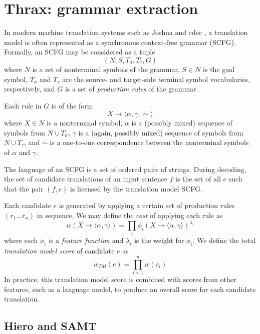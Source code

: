\documentclass[11pt]{article}
\begin{document}
\section{Thrax: grammar extraction}

In modern machine translation systems such as Joshua \cite{Joshua-WMT} and cdec \cite{cdec}, a translation model is often represented as a synchronous context-free grammar (SCFG). Formally, an SCFG may be considered as a tuple
$$(N,S,T_\sigma,T_\tau,G)$$
where $N$ is a set of nonterminal symbols of the grammar, $S \in N$ is the goal symbol, $T_\sigma$ and $T_\tau$ are the source- and target-side terminal symbol vocabularies, respectively, and $G$ is a set of {\em production rules} of the grammar.

Each rule in $G$ is of the form
$$X \to \langle \alpha , \gamma , \sim \rangle$$
where $X \in N$ is a nonterminal symbol, $\alpha$ is a (possibly mixed) sequence of symbols from $N \cup T_\sigma$, $\gamma$ is a (again, possibly mixed) sequence of symbols from $N \cup T_\tau$, and $\sim$ is a one-to-one correspondence between the nonterminal symbols of $\alpha$ and $\gamma$.

The language of an SCFG is a set of ordered pairs of strings. During decoding, the set of candidate translations of an input sentence $f$ is the set of all $e$ such that the pair $(f,e)$ is licensed by the translation model SCFG.

Each candidate $e$ is generated by applying a certain set of production rules $(r_1 \ldots r_n)$ in sequence. We may define the {\em cost} of applying each rule as
\begin{equation}
w(X \to \langle \alpha, \gamma \rangle) = \prod_i{\phi_i(X \to \langle \alpha , \gamma \rangle)^{\lambda_i}}
\end{equation}
where each $\phi_i$ is a {\em feature function} and $\lambda_i$ is the weight for $\phi_i$.
We define the total {\em translation model score} of candidate $e$ as
\begin{equation}
w_{TM}(e) = \prod_{i=1}^n{w(r_i)}
\end{equation}
In practice, this translation model score is combined with scores from other features, such as a language model, to produce an overall score for each candidate translation.

\subsection{Hiero and SAMT}
\end{document}
